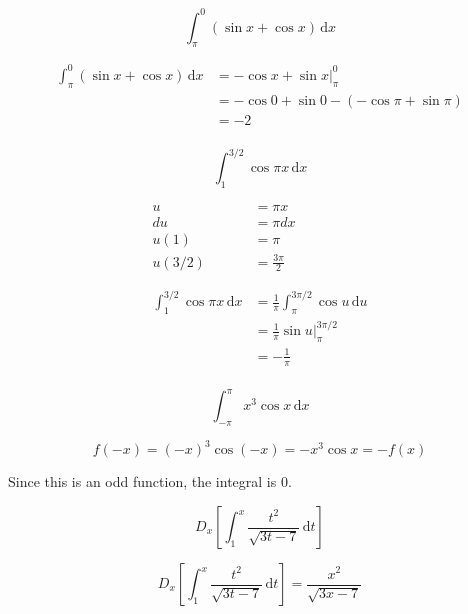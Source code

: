 \documentclass[fleqn,addpoints]{exam}
\begin{document}
\begin{questions}
\pagebreak

\question[7]
\[
  \int_{\pi}^0 (\sin x + \cos x) \, \mathrm{d}x  
\]

\begin{solution}[8 cm]
\begin{align*}
  \int_{\pi}^0 (\sin x + \cos x) \, \mathrm{d}x &= -\cos x + \sin x \bigg|_{\pi}^0 \\
  &= -\cos 0 + \sin 0 - (-\cos \pi + \sin \pi) \\
  &= -2 \\
\end{align*}
\end{solution}

\question[8]
\[
  \int_{1}^{3/2} \cos \pi x  \, \mathrm{d}x
\]

\begin{solution}[8 cm]
\begin{align*}
  u &= \pi x \\
  du &= \pi dx \\
  u(1) &= \pi \\
  u(3/2) &= \frac{3\pi}{2} \\ \\
\\
  \int_1^{3/2} \cos \pi x  \, \mathrm{d}x &= \frac{1}{\pi} \int_{\pi}^{3\pi/2} \cos u \, \mathrm{d}u \\
  &= \frac{1}{\pi} \sin u \bigg|_{\pi}^{3 \pi/2} \\
  &= -\frac{1}{\pi} \\
\end{align*}

\end{solution}

\pagebreak

\question[5]
\[
  \int_{-\pi}^{\pi} x^3 \cos x \, \mathrm{d}x  
\]

\begin{solution}[8 cm]
\[
  f(-x) = (-x)^3 \cos (-x) = -x^3 \cos x = -f(x)
\]

Since this is an odd function, the integral is 0.

\end{solution}

\question[5]
\[
  D_x \left[ \int_1^x \frac{t^2}{\sqrt{3t - 7}} \, \mathrm{d}t \right]
\]
\begin{solution}[8 cm]
\[
  D_x \left[ \int_1^x \frac{t^2}{\sqrt{3t - 7}} \, \mathrm{d}t \right] = \frac{x^2}{\sqrt{3x - 7}} 
\]
\end{solution}

\pagebreak



\end{questions}
\end{document}
